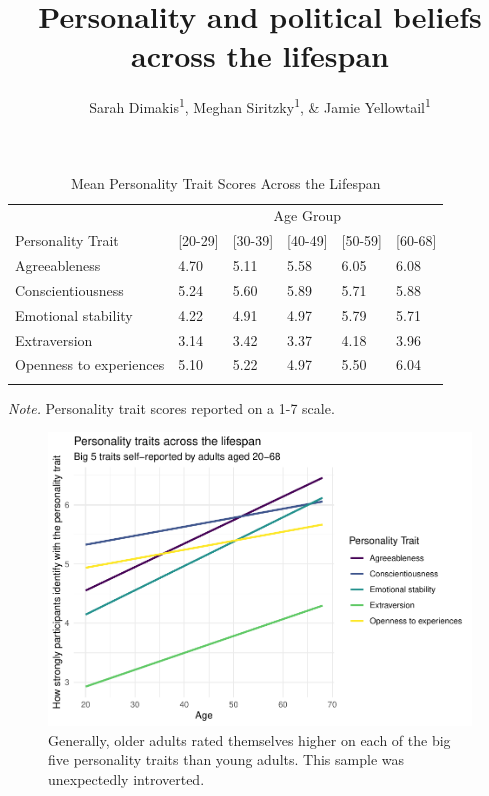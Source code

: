 \documentclass[man]{apa6}
\title{Personality and political beliefs across the lifespan}
\author{Sarah Dimakis\textsuperscript{1}, Meghan Siritzky\textsuperscript{1}, \&
Jamie Yellowtail\textsuperscript{1}}
\date{}
\affiliation{
\vspace{0.5cm}
\textsuperscript{1} University of Oregon}
\begin{document}
\maketitle

\begin{table}[tbp]
\begin{center}
\begin{threeparttable}
\caption{\label{tab:table1}Mean Personality Trait Scores Across the Lifespan}
\begin{tabular}{llllll}
\toprule
 & \multicolumn{5}{c}{Age Group} \\
\cmidrule(r){2-6}
Personality Trait & \multicolumn{1}{c}{[20-29]} & \multicolumn{1}{c}{[30-39]} & \multicolumn{1}{c}{[40-49]} & \multicolumn{1}{c}{[50-59]} & \multicolumn{1}{c}{[60-68]}\\
\midrule
Agreeableness & 4.70 & 5.11 & 5.58 & 6.05 & 6.08\\
Conscientiousness & 5.24 & 5.60 & 5.89 & 5.71 & 5.88\\
Emotional stability & 4.22 & 4.91 & 4.97 & 5.79 & 5.71\\
Extraversion & 3.14 & 3.42 & 3.37 & 4.18 & 3.96\\
Openness to experiences & 5.10 & 5.22 & 4.97 & 5.50 & 6.04\\
\bottomrule
\addlinespace
\end{tabular}
\begin{tablenotes}[para]
\normalsize{\textit{Note.} Personality trait scores reported on a 1-7 scale.}
\end{tablenotes}
\end{threeparttable}
\end{center}
\end{table}

\begin{figure}
\centering
\includegraphics{manuscript_files/figure-latex/figure1-1.pdf}
\caption{\label{fig:figure1}Generally, older adults rated themselves higher
on each of the big five personality traits than young adults. This
sample was unexpectedly introverted.}
\end{figure}
\end{document}
